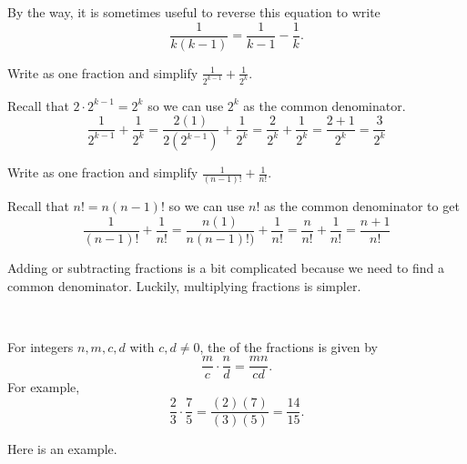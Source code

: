 \begin{exam} 
\begin{apart}
\begin{soln}
                By the way, it is sometimes useful to reverse this equation to write $$\frac{1}{k(k-1)} = \frac{1}{k-1} - \frac{1}{k}.$$  
            \end{soln}

        \item Write as one fraction and simplify
        $\displaystyle \frac{1}{2^{k-1}} + \frac{1}{2^k}.$
            \begin{soln}
                Recall that $2\cdot 2^{k-1} =2^k$ so we can 
                use $2^k$ as the common denominator.
                $$\displaystyle \frac{1}{2^{k-1}} + \frac{1}{2^k}
                = \frac{2(1)}{2(2^{k-1})} + \frac{1}{2^k}
                = \frac{2}{2^k} + \frac{1}{2^k}
                = \frac{2+1}{2^k}
                = \frac{3}{2^k}
                $$
            \end{soln}
        \item Write as one fraction and simplify
        $\displaystyle \frac{1}{(n-1)!} + \frac{1}{n!}.$
            \begin{soln}
                Recall that $n!=n(n-1)!$ so we can use $n!$ as the common denominator to get
                    $$\displaystyle \frac{1}{(n-1)!} + \frac{1}{n!}
                    = \frac{n(1)}{n(n-1)!)} + \frac{1}{n!}
                    = \frac{n}{n!} + \frac{1}{n!}
                    = \frac{n+1}{n!}$$
             \end{soln}
    \end{apart}
\end{exam}

Adding or subtracting fractions is a bit complicated because we need to find a common denominator.  Luckily, multiplying fractions is simpler.

\begin{defn}
\label{defn_multiplying_fractions}
~
    \begin{apart}
        \item For integers $n, m, c, d$ with $c,d \neq 0$, the  of the fractions is given by
        $$\frac{m}{c} \cdot \frac{n}{d} = \frac{mn}{cd}.$$
        For example, 
        $$\frac{2}{3} \cdot \frac{7}{5} 
        = \frac{(2)(7)}{(3)(5)} = \frac{14}{15}.$$
    \end{apart}
\end{defn}

Here is an example.

